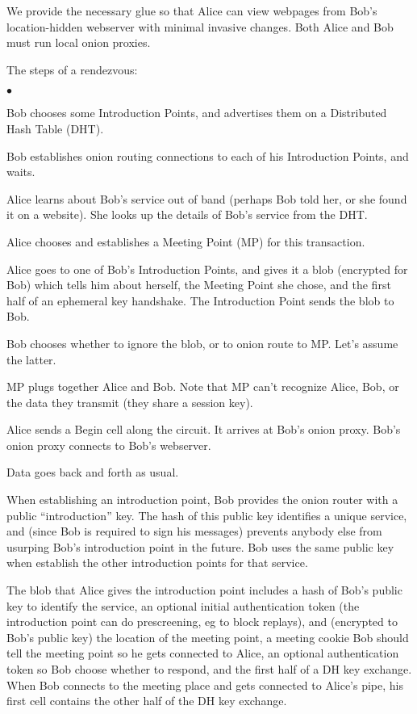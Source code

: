 \documentclass[times,10pt,twocolumn]{article}
\newenvironment{tightlist}{\begin{list}{$\bullet$}{
  \setlength{\itemsep}{0mm}
    \setlength{\parsep}{0mm}
    }}{\end{list}}
\begin{document}
We provide the necessary glue so that Alice can view webpages from Bob's
location-hidden webserver with minimal invasive changes. Both Alice and
Bob must run local onion proxies.

The steps of a rendezvous:
\begin{tightlist}
\item Bob chooses some Introduction Points, and advertises them on a
      Distributed Hash Table (DHT).
\item Bob establishes onion routing connections to each of his
      Introduction Points, and waits.
\item Alice learns about Bob's service out of band (perhaps Bob told her,
      or she found it on a website). She looks up the details of Bob's
      service from the DHT.
\item Alice chooses and establishes a Meeting Point (MP) for this
      transaction.
\item Alice goes to one of Bob's Introduction Points, and gives it a blob
      (encrypted for Bob) which tells him about herself, the Meeting Point
      she chose, and the first half of an ephemeral key handshake. The
      Introduction Point sends the blob to Bob.
\item Bob chooses whether to ignore the blob, or to onion route to MP.
      Let's assume the latter.
\item MP plugs together Alice and Bob. Note that MP can't recognize Alice,
      Bob, or the data they transmit (they share a session key).
\item Alice sends a Begin cell along the circuit. It arrives at Bob's
      onion proxy. Bob's onion proxy connects to Bob's webserver.
\item Data goes back and forth as usual.
\end{tightlist}

When establishing an introduction point, Bob provides the onion router
with a public ``introduction'' key.  The hash of this public key
identifies a unique service, and (since Bob is required to sign his
messages) prevents anybody else from usurping Bob's introduction point
in the future. Bob uses the same public key when establish the other
introduction points for that service.

The blob that Alice gives the introduction point includes a hash of Bob's
public key to identify the service, an optional initial authentication
token (the introduction point can do prescreening, eg to block replays),
and (encrypted to Bob's public key) the location of the meeting point,
a meeting cookie Bob should tell the meeting point so he gets connected to
Alice, an optional authentication token so Bob choose whether to respond,
and the first half of a DH key exchange. When Bob connects to the meeting
place and gets connected to Alice's pipe, his first cell contains the
other half of the DH key exchange.
\end{document}
